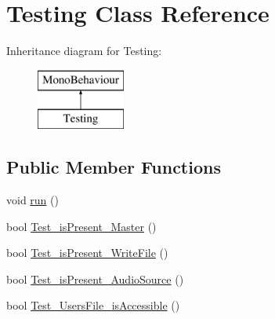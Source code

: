 \hypertarget{class_testing}{}\section{Testing Class Reference}
\label{class_testing}
Inheritance diagram for Testing\+:\begin{figure}[H]
\begin{center}
\leavevmode
\includegraphics[height=2.000000cm]{class_testing}
\end{center}
\end{figure}
\subsection*{Public Member Functions}
\begin{DoxyCompactItemize}
\item 
void \mbox{\hyperlink{class_testing_a936aed5318322b1d36361ff2952fcf10}{run}} ()
\item 
bool \mbox{\hyperlink{class_testing_acf56298e1ba9488b9f5d7080b6d689ff}{Test\+\_\+is\+Present\+\_\+\+Master}} ()
\item 
bool \mbox{\hyperlink{class_testing_add39eb411904617805391bdfe144fa1e}{Test\+\_\+is\+Present\+\_\+\+Write\+File}} ()
\item 
bool \mbox{\hyperlink{class_testing_af393c6207f2e218b588978223387192a}{Test\+\_\+is\+Present\+\_\+\+Audio\+Source}} ()
\item 
bool \mbox{\hyperlink{class_testing_a754f7be45cad9df07476d84d2fc08569}{Test\+\_\+\+Users\+File\+\_\+is\+Accessible}} ()
\end{DoxyCompactItemize}
